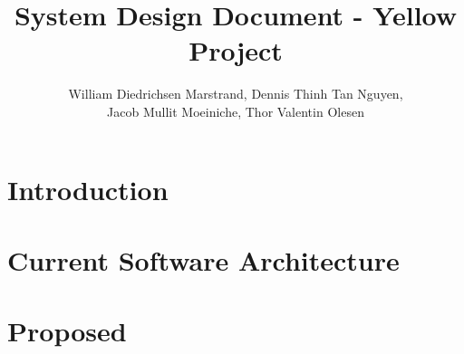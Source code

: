 \documentclass{article}
\title{System Design Document - Yellow Project}
\author{William Diedrichsen Marstrand, Dennis Thinh Tan Nguyen, 
\\Jacob Mullit Moeiniche, Thor Valentin Olesen}
\begin{document}
\maketitle

\section{Introduction}
	
	

\section{Current Software Architecture}

\section{Proposed}
	
	
\end{document}
